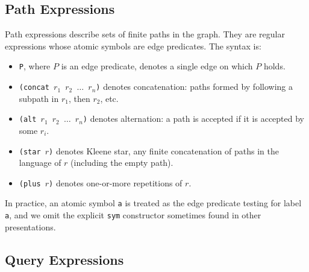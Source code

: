 \documentclass[11pt]{article}
\begin{document}
\subsection{Path Expressions}

Path expressions describe sets of finite paths in the graph.  They are
regular expressions whose atomic symbols are edge predicates.  The
syntax is:
\begin{itemize}[leftmargin=*]
  \item \texttt{P}, where $P$ is an edge predicate, denotes a single
        edge on which $P$ holds.
  \item \texttt{(concat $r_1$ $r_2$ $\dots$ $r_n$)} denotes
        concatenation: paths formed by following a subpath in $r_1$,
        then $r_2$, etc.
  \item \texttt{(alt $r_1$ $r_2$ $\dots$ $r_n$)} denotes alternation:
        a path is accepted if it is accepted by some $r_i$.
  \item \texttt{(star $r$)} denotes Kleene star, any finite
        concatenation of paths in the language of $r$ (including the
        empty path).
  \item \texttt{(plus $r$)} denotes one-or-more repetitions of $r$.
\end{itemize}

In practice, an atomic symbol \texttt{a} is treated as the edge
predicate testing for label \texttt{a}, and we omit the explicit
\texttt{sym} constructor sometimes found in other presentations.

\subsection{Query Expressions}
\end{document}
